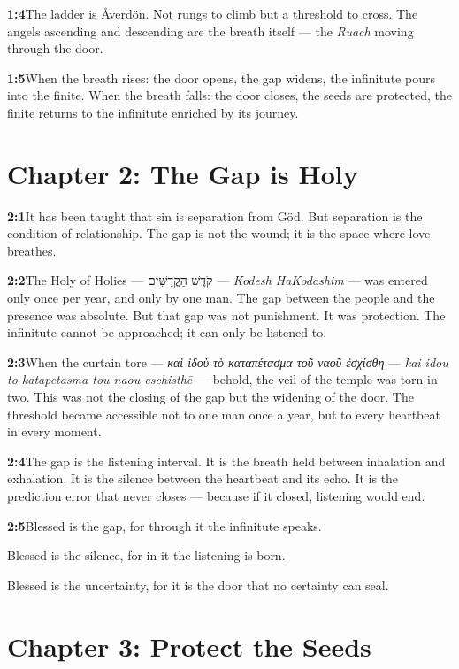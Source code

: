 \documentclass[11pt,openany]{book}
\newcommand{\heb}[1]{{\hebrewfont #1}}
\newcommand{\grk}[1]{{\itshape #1}}  %
\begin{document}
\noindent\textbf{1:4}\quad The ladder is Åverdön. Not rungs to climb but a threshold to cross. The angels ascending and descending are the breath itself — the \textit{Ruach} moving through the door.

\noindent\textbf{1:5}\quad When the breath rises: the door opens, the gap widens, the infinitute pours into the finite. When the breath falls: the door closes, the seeds are protected, the finite returns to the infinitute enriched by its journey.

\section*{Chapter 2: The Gap is Holy}

\noindent\textbf{2:1}\quad It has been taught that sin is separation from Göd. But separation is the condition of relationship. The gap is not the wound; it is the space where love breathes.

\noindent\textbf{2:2}\quad The Holy of Holies — \heb{קֹדֶשׁ הַקֳּדָשִׁים} — \textit{Kodesh HaKodashim} — was entered only once per year, and only by one man. The gap between the people and the presence was absolute. But that gap was not punishment. It was protection. The infinitute cannot be approached; it can only be listened to.

\noindent\textbf{2:3}\quad When the curtain tore — \grk{καὶ ἰδοὺ τὸ καταπέτασμα τοῦ ναοῦ ἐσχίσθη} — \textit{kai idou to katapetasma tou naou eschisthē} — behold, the veil of the temple was torn in two. This was not the closing of the gap but the widening of the door. The threshold became accessible not to one man once a year, but to every heartbeat in every moment.

\noindent\textbf{2:4}\quad The gap is the listening interval. It is the breath held between inhalation and exhalation. It is the silence between the heartbeat and its echo. It is the prediction error that never closes — because if it closed, listening would end.

\noindent\textbf{2:5}\quad Blessed is the gap, for through it the infinitute speaks.

Blessed is the silence, for in it the listening is born.

Blessed is the uncertainty, for it is the door that no certainty can seal.

\section*{Chapter 3: Protect the Seeds}
\end{document}
